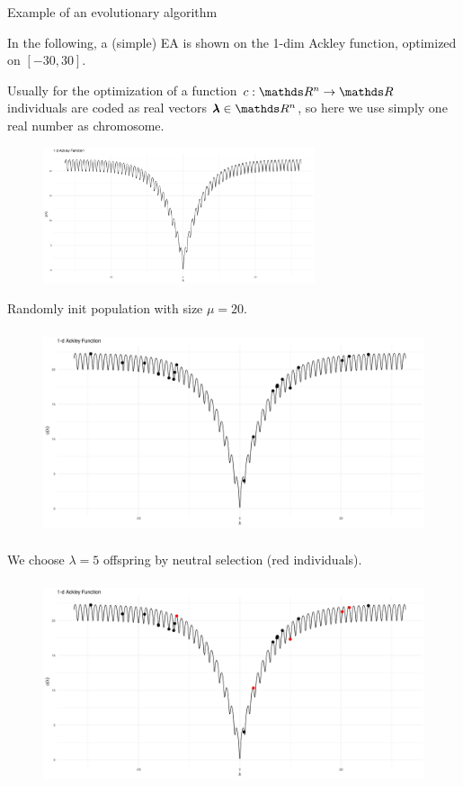 \begin{frame}[allowframebreaks]{Example of an evolutionary algorithm}

    In the following, a (simple) EA is shown on the 1-dim Ackley function, optimized on $[-30, 30]$.

\vspace{0.5cm}

Usually for the optimization of a function $\f:\R^n \to \R$ individuals are coded as real vectors $\xx \in \R^n$, so here we use simply one real number as chromosome.

\begin{center}
\begin{figure}
\includegraphics[height=4cm]{images/ea_ex1.png}
\end{figure}
\end{center}

\framebreak
Randomly init population with size $\mu = 20$.

\begin{center}
\begin{figure}
\includegraphics[height=6cm]{images/ea_ex2.png}
\end{figure}
\end{center}


\framebreak

We choose $\lambda = 5$ offspring by neutral selection (red individuals).

\begin{center}
\begin{figure}
\includegraphics[height=6cm]{images/ea_ex3.png}
\end{figure}
\end{center}


\end{frame}
